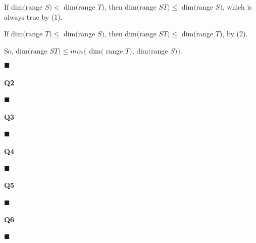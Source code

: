 \documentclass{article}
\begin{document}
If dim$($range $S) <$ dim$($range $T)$, then  dim$($range $ST) \leq$
dim$($range $S)$, which is always true by (1).

If dim$($range $T) \leq$ dim$($range $S)$, then  dim$($range $ST) \leq$
dim$($range $T)$, by (2).

So, dim$($range $ST) \leq min\{$ dim$($ range $T)$, dim$($range
$S)\}$.
\vspace{0.618 em}

$\blacksquare$

\paragraph{Q2}

\vspace{0.618 em}

\vspace{0.618 em}

$\blacksquare$



\paragraph{Q3}

\vspace{0.618 em}

\vspace{0.618 em}

$\blacksquare$

\paragraph{Q4}

\vspace{0.618 em}

\vspace{0.618 em}

$\blacksquare$

\paragraph{Q5}

\vspace{0.618 em}

\vspace{0.618 em}

$\blacksquare$


\paragraph{Q6}

\vspace{0.618 em}

\vspace{0.618 em}

$\blacksquare$
\end{document}
